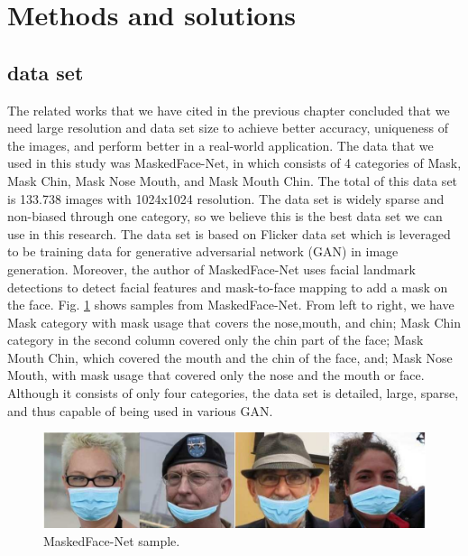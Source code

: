 \documentclass{article}
\begin{document}
\section{Methods and solutions}
\subsection{data set}\label{data_sets}
The related works that we have cited in the previous chapter concluded that we need large resolution and data set size to achieve better accuracy, uniqueness of the images, and perform better in a real-world application.
The data that we used in this study was MaskedFace-Net, \citep{Cabani2021} in which consists of 4 categories of Mask, Mask Chin, Mask Nose Mouth, and Mask Mouth Chin. The total of this data set is 133.738 images with 1024x1024 resolution. The data set is widely sparse and non-biased through one category, so we believe this is the best data set we can use in this research. The data set is based on Flicker data set \citep{karras2018gan} which is leveraged to be training data for generative adversarial network (GAN) in image generation. Moreover, the author of MaskedFace-Net uses facial landmark detections to detect facial features and mask-to-face mapping to add a mask on the face. Fig. \ref{mfn_fig} shows samples from MaskedFace-Net. From left to right, we have Mask category with mask usage that covers the nose,mouth, and chin; Mask Chin category in the second column covered only the chin part of the face; Mask Mouth Chin, which covered the mouth and the chin of the face, and; Mask Nose Mouth, with mask usage that covered only the nose and the mouth or face. Although it consists of only four categories, the data set is detailed, large, sparse, and thus capable of being used in various GAN\citep{karras2018gan}.
\begin{figure}[!b]
	\centering
	\includegraphics[scale=.3]{mfn.pdf}
	\caption{MaskedFace-Net sample.}
	\label{mfn_fig}
\end{figure}
\end{document}
